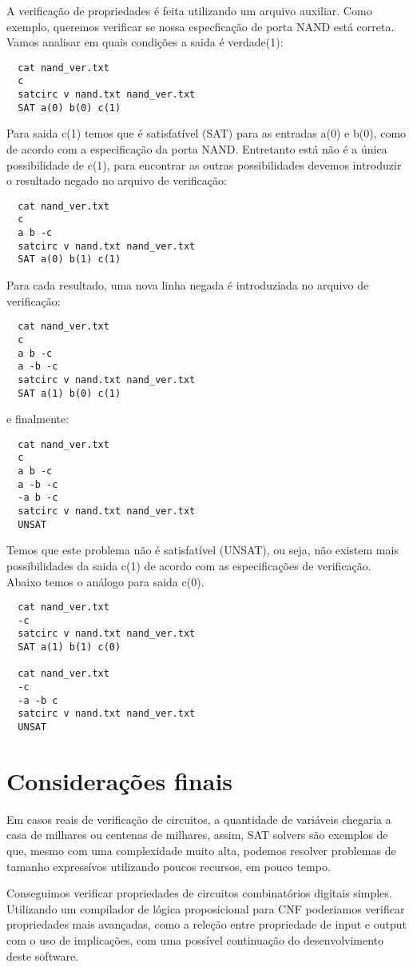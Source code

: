 A verificação de propriedades é feita utilizando um arquivo auxiliar. Como
exemplo, queremos verificar se nossa especficação de porta NAND está correta.
Vamos analisar em quais condições a saida é verdade(1):
\begin{lstlisting}
  cat nand_ver.txt
  c
  satcirc v nand.txt nand_ver.txt
  SAT a(0) b(0) c(1)
\end{lstlisting}
Para saida c(1) temos que é satisfatível (SAT) para as entradas a(0) e b(0),
como de acordo com a especificação da porta NAND. Entretanto está não é a
única possibilidade de c(1), para encontrar as outras possibilidades devemos
introduzir o resultado negado no arquivo de verificação:
\begin{lstlisting}
  cat nand_ver.txt
  c
  a b -c
  satcirc v nand.txt nand_ver.txt
  SAT a(0) b(1) c(1)
\end{lstlisting}
Para cada resultado, uma nova linha negada é introduziada no arquivo de
verificação:
\begin{lstlisting}
  cat nand_ver.txt
  c
  a b -c
  a -b -c
  satcirc v nand.txt nand_ver.txt
  SAT a(1) b(0) c(1)
\end{lstlisting}
e finalmente:
\begin{lstlisting}
  cat nand_ver.txt
  c
  a b -c
  a -b -c
  -a b -c
  satcirc v nand.txt nand_ver.txt
  UNSAT
\end{lstlisting}
Temos que este problema não é satisfatível (UNSAT), ou seja, não existem mais
possibilidades da saida c(1) de acordo com as especificações de
verificação. Abaixo temos o análogo para saida c(0).
\begin{lstlisting}
  cat nand_ver.txt
  -c
  satcirc v nand.txt nand_ver.txt
  SAT a(1) b(1) c(0)
  
  cat nand_ver.txt
  -c
  -a -b c
  satcirc v nand.txt nand_ver.txt
  UNSAT
\end{lstlisting}

\section{Considerações finais}
Em casos reais de verificação de circuitos, a quantidade
de variáveis chegaria a casa de milhares ou centenas de milhares,
assim, SAT solvers são exemplos de que, mesmo com uma complexidade muito alta,
podemos resolver problemas de tamanho expressívos utilizando poucos recursos,
em pouco tempo. 

Conseguimos verificar propriedades de circuitos combinatórios digitais
simples. Utilizando um compilador de lógica proposicional para CNF poderiamos
verificar propriedades mais avançadas, como a releção entre propriedade
de input e output com o uso de implicações, com uma possível continuação
do desenvolvimento deste software. 

